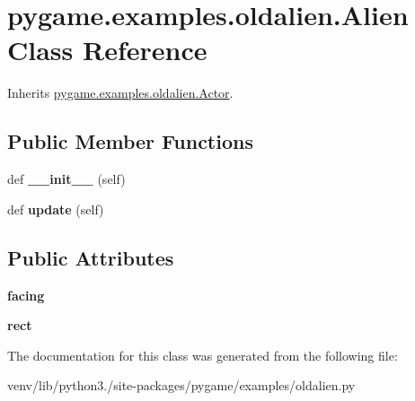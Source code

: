 \hypertarget{classpygame_1_1examples_1_1oldalien_1_1_alien}{}\section{pygame.\+examples.\+oldalien.\+Alien Class Reference}
\label{classpygame_1_1examples_1_1oldalien_1_1_alien}


Inherits \hyperlink{classpygame_1_1examples_1_1oldalien_1_1_actor}{pygame.\+examples.\+oldalien.\+Actor}.

\subsection*{Public Member Functions}
\begin{DoxyCompactItemize}
\item 
\mbox{\label{classpygame_1_1examples_1_1oldalien_1_1_alien_ac265bf0b57d11361299e2394a87a8a82}} 
def {\bfseries \+\_\+\+\_\+init\+\_\+\+\_\+} (self)
\item 
\mbox{\label{classpygame_1_1examples_1_1oldalien_1_1_alien_a30a2e7215bb57aec9fdcffb5cec1e5d4}} 
def {\bfseries update} (self)
\end{DoxyCompactItemize}
\subsection*{Public Attributes}
\begin{DoxyCompactItemize}
\item 
\mbox{\label{classpygame_1_1examples_1_1oldalien_1_1_alien_a7ab1a19abf9bb03325aed3ed56aa1bcc}} 
{\bfseries facing}
\item 
\mbox{\label{classpygame_1_1examples_1_1oldalien_1_1_alien_a29f0e81f3ae624ee39de46f068a4fd5b}} 
{\bfseries rect}
\end{DoxyCompactItemize}


The documentation for this class was generated from the following file\+:\begin{DoxyCompactItemize}
\item 
venv/lib/python3./site-\/packages/pygame/examples/oldalien.\+py\end{DoxyCompactItemize}
